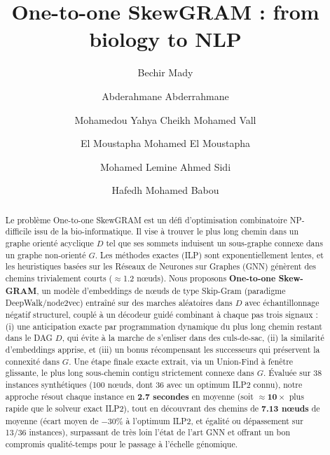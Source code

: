 \documentclass{llncs}
\begin{document}
\title{One-to-one SkewGRAM : from biology to NLP}
\author{
Bechir Mady \and
Abderahmane Abderrahmane \and
Mohamedou Yahya Cheikh Mohamed Vall \and
El Moustapha Mohamed El Moustapha \and
Mohamed Lemine Ahmed Sidi \and
Hafedh Mohamed Babou
}


\maketitle

\begin{abstract}
Le problème One-to-one SkewGRAM est un défi d'optimisation combinatoire NP-difficile issu de la bio-informatique. Il vise à trouver le plus long chemin dans un graphe orienté acyclique $D$ tel que ses sommets induisent un sous-graphe connexe dans un graphe non-orienté $G$. Les méthodes exactes (ILP) sont exponentiellement lentes, et les heuristiques basées sur les Réseaux de Neurones sur Graphes (GNN) génèrent des chemins trivialement courts ($\approx$1.2 nœuds). Nous proposons \textbf{One-to-one Skew-GRAM}, un modèle d'embeddings de nœuds de type Skip-Gram (paradigme DeepWalk/node2vec) entraîné sur des marches aléatoires dans $D$ avec échantillonnage négatif structurel, couplé à un décodeur guidé combinant à chaque pas trois signaux : (i) une anticipation exacte par programmation dynamique du plus long chemin restant dans le DAG $D$, qui évite à la marche de s'enliser dans des culs-de-sac, (ii) la similarité d'embeddings apprise, et (iii) un bonus récompensant les successeurs qui préservent la connexité dans $G$. Une étape finale exacte extrait, via un Union-Find à fenêtre glissante, le plus long sous-chemin contigu strictement connexe dans $G$. Évaluée sur 38 instances synthétiques (100 nœuds, dont 36 avec un optimum ILP2 connu), notre approche résout chaque instance en \textbf{2.7 secondes} en moyenne (soit $\approx \mathbf{10\times}$ plus rapide que le solveur exact ILP2), tout en découvrant des chemins de \textbf{7.13 nœuds} de moyenne (écart moyen de $-30\%$ à l'optimum ILP2, et égalité ou dépassement sur 13/36 instances), surpassant de très loin l'état de l'art GNN et offrant un bon compromis qualité-temps pour le passage à l'échelle génomique.
\end{abstract}
\end{document}

